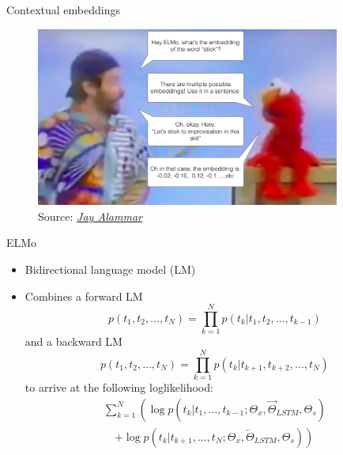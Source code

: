 
\begin{vbframe}{Contextual embeddings}

\vfill

	\begin{figure}
		\centering
		\includegraphics[width = 10cm]{figure/elmo-embedding-robin-williams.png}\\ 
		\footnotesize{Source:} \href{https://jalammar.github.io/illustrated-bert/}{\footnotesize \it Jay Alammar}
	\end{figure}

\vfill

\end{vbframe}


\begin{vbframe}{ELMo \href{https://www.aclweb.org/anthology/N18-1202.pdf}{}}

\vfill

\begin{itemize}
		\item Bidirectional language model (LM)
		\item Combines a forward LM $$p\left(t_{1}, t_{2}, \ldots, t_{N}\right)=\prod_{k=1}^{N} p\left(t_{k} | t_{1}, t_{2}, \ldots, t_{k-1}\right)$$
					and a backward LM $$p\left(t_{1}, t_{2}, \ldots, t_{N}\right)=\prod_{k=1}^{N} p\left(t_{k} | t_{k+1}, t_{k+2}, \ldots, t_{N}\right)$$
					to arrive at the following loglikelihood:
					$$\begin{array}{l}
\sum_{k=1}^{N}\left(\log p\left(t_{k} | t_{1}, \ldots, t_{k-1} ; \Theta_{x}, \overrightarrow{\Theta}_{L S T M}, \Theta_{s}\right)\right. \\
\quad\left. +\log p\left(t_{k} | t_{k+1}, \ldots, t_{N} ; \Theta_{x}, \overleftarrow{\Theta}_{L S T M}, \Theta_{s}\right)\right)
\end{array}$$
	\end{itemize}

\vfill

\end{vbframe}

